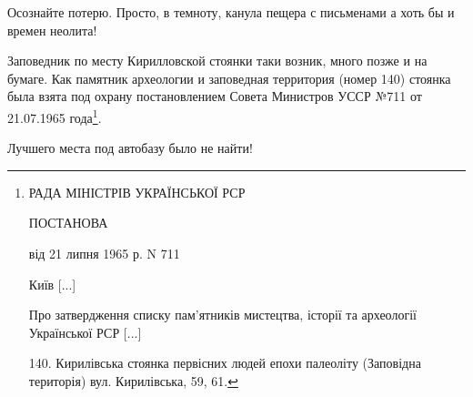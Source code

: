 Осознайте потерю. Просто, в темноту, канула пещера с письменами а хоть бы и времен неолита!


Заповедник по месту Кирилловской стоянки таки возник, много позже и на бумаге. Как памятник археологии и заповедная территория (номер 140) стоянка была взята под охрану постановлением Совета Министров УССР №711 от 21.07.1965 года\footnote{
РАДА МІНІСТРІВ УКРАЇНСЬКОЇ РСР

ПОСТАНОВА

від 21 липня 1965 р. N 711

Київ [...]

Про затвердження списку пам'ятників мистецтва, історії та археології Української РСР [...]

140. Кирилівська стоянка первісних людей епохи палеоліту (Заповідна територія) вул. Кирилівська, 59, 61.}.

Лучшего места под автобазу было не найти!




